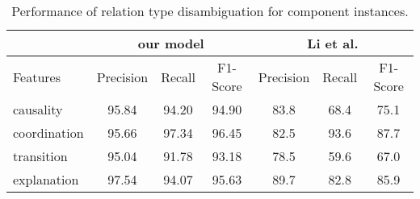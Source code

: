 \begin{table}[ht]
\centering
\begin{tabular}{|l|c|c|c|c|c|c|}
\hline

                        & \multicolumn{3}{c|}{our model}            & \multicolumn{3}{c|}{Li et al.}            \\ \hline
    Features            &     Precision &     Recall &     F1-Score &     Precision &     Recall &     F1-Score \\ \hline
    causality           &     95.84     &     94.20  &     94.90    &     83.8      &     68.4   &     75.1     \\ \hline
    coordination        &     95.66     &     97.34  &     96.45    &     82.5      &     93.6   &     87.7     \\ \hline
    transition          &     95.04     &     91.78  &     93.18    &     78.5      &     59.6   &     67.0     \\ \hline
    explanation         &     97.54     &     94.07  &     95.63    &     89.7      &     82.8   &     85.9     \\ \hline

\end{tabular}
\caption{\label{t:sense-word-types} Performance of relation type
disambiguation for component instances. }
\end{table}
